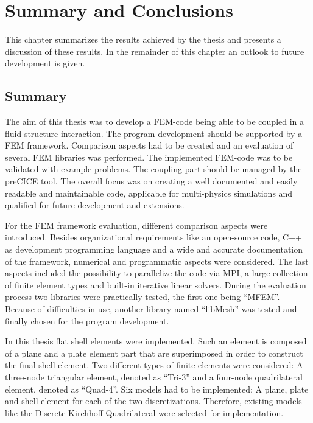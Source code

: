 \section{Summary and Conclusions}
 This chapter summarizes the results achieved by the thesis and presents a discussion of these results. In the remainder of this chapter an outlook to future development is given.
 
 
 \subsection{Summary}
  The aim of this thesis was to develop a FEM-code being able to be coupled in a fluid-structure interaction. The program development should be supported by a FEM framework. Comparison aspects had to be created and an evaluation of several FEM libraries was performed. The implemented FEM-code was to be validated with example problems. The coupling part should be managed by the preCICE tool. The overall focus was on creating a well documented and easily readable and maintainable code, applicable for multi-physics simulations and qualified for future development and extensions.

  For the FEM framework evaluation, different comparison aspects were introduced. Besides organizational requirements like an open-source code, C++ as development programming language and a wide and accurate documentation of the framework, numerical and programmatic aspects were considered. The last aspects included the possibility to parallelize the code via MPI, a large collection of finite element types and built-in iterative linear solvers. During the evaluation process two libraries were practically tested, the first one being ``MFEM''. Because of difficulties in use, another library named ``libMesh'' was tested and finally chosen for the program development.  

  In this thesis flat shell elements were implemented. Such an element is composed of a plane and a plate element part that are superimposed in order to construct the final shell element. Two different types of finite elements were considered: A three-node triangular element, denoted as ``Tri-3'' and a four-node quadrilateral element, denoted as ``Quad-4''. Six models had to be implemented: A plane, plate and shell element for each of the two discretizations. Therefore, existing models like the Discrete Kirchhoff Quadrilateral were selected for implementation.

